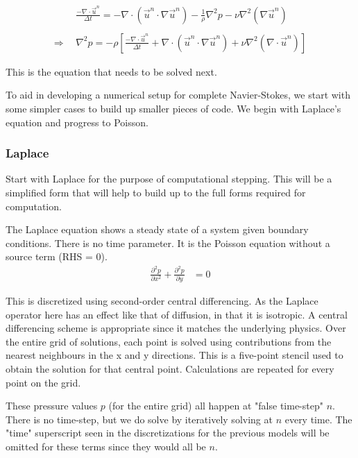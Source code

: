 \documentclass[11pt]{article}
\begin{document}
{\begin{align}
& \frac{- \nabla \cdot \vec{u}^n}{\Delta t}
	= - \nabla \cdot (\vec{u}^n \cdot \nabla \vec{u}^n)
	  - \frac{1}{\rho} \nabla^2 p
	  - \nu \nabla^2(\nabla \vec{u}^n)
														  \nonumber \\ \nonumber \\
\Rightarrow ~~&
\nabla^2 p = -\rho \left[
					\frac{ - \nabla \cdot \vec{u}^n}{\Delta t}
					+ \nabla \cdot (\vec{u}^n \cdot \nabla \vec{u}^n)
					+ \nu \nabla^2(\nabla \cdot \vec{u}^n)			\right]
\label{discrete_poisson_vector}
\end{align}

This is the equation that needs to be solved next.

To aid in developing a numerical setup for complete Navier-Stokes, we start with some simpler
cases to build up smaller pieces of code. We begin with Laplace's equation and progress to
Poisson.

\subsubsection{Laplace}
Start with Laplace for the purpose of computational stepping. This will be a simplified form
that will help to build up to the full forms required for computation.

The Laplace equation shows a steady state of a system given boundary
conditions. There is no time parameter. It is the Poisson equation without a source term (RHS = 0).
\begin{align}
\frac{\partial^2 p}{\partial x^2} + \frac{\partial^2 p}{\partial y} &= 0
\label{laplace}
\end{align}

This is discretized using second-order central differencing. As the Laplace operator here
has an effect like that of diffusion, in that it is isotropic. A central differencing scheme
is appropriate since it matches the underlying physics. Over the entire grid of solutions,
each point is solved using contributions from the nearest neighbours in the x and y directions.
This is a five-point stencil used to obtain the solution for that central point. Calculations
are repeated for every point on the grid.

These pressure values $p$ (for the entire grid) all happen
at "false time-step" $n$. There is no time-step, but we do solve by iteratively solving at $n$
every time. The "time" superscript seen in the discretizations for the previous models will be
omitted for these terms since they would all be $n$.

}
\end{document}
